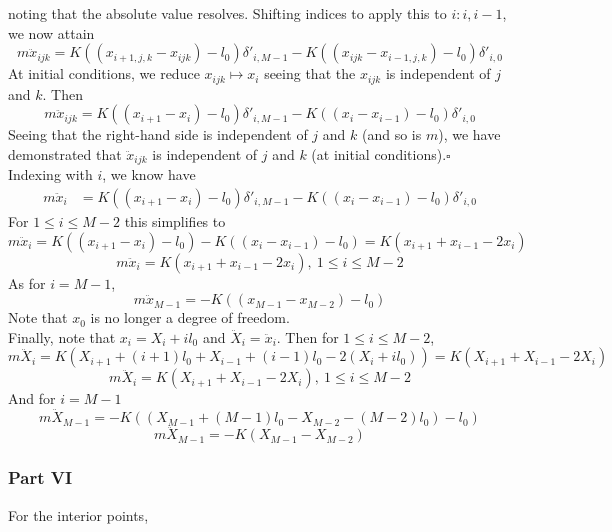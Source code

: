 \documentclass[letterpaper,12pt]{article}
\renewcommand*{\qed}{\hfill\ensuremath{\square}}
\begin{document}
\begin{flushleft}
    noting that the absolute value resolves. Shifting indices to apply this to $i:i,i-1$, we now attain
    $$m\ddot{x}_{ijk} = K\left((x_{i+1,j,k} - x_{ijk}) - l_0\right)\delta'_{i,M-1} - K\left((x_{ijk} - x_{i-1,j,k}) - l_0\right)\delta'_{i,0}$$
    At initial conditions, we reduce $x_{ijk} \mapsto x_i$ seeing that the $x_{ijk}$ is independent of $j$ and $k$. Then
    $$m\ddot{x}_{ijk} = K\left((x_{i+1} - x_{i}) - l_0\right)\delta'_{i,M-1} - K\left((x_{i} - x_{i-1}) - l_0\right)\delta'_{i,0}$$
    Seeing that the right-hand side is independent of $j$ and $k$ (and so is $m$), we have demonstrated that $\ddot{x}_{ijk}$ is independent of $j$ and $k$ (at initial conditions).\qed\\
    Indexing with $i$, we know have
    \begin{align*}
        m\ddot{x}_{i} &= K\left((x_{i+1} - x_{i}) - l_0\right)\delta'_{i,M-1} - K\left((x_{i} - x_{i-1}) - l_0\right)\delta'_{i,0}
    \end{align*}
    For $1 \leq i \leq M-2$ this simplifies to
    $$m\ddot{x}_i = K\left((x_{i+1} - x_{i}) - l_0\right) - K\left((x_{i} - x_{i-1}) - l_0\right) = K\left(x_{i+1} + x_{i-1} - 2x_i\right)$$
    $$\boxed{m\ddot{x}_i = K\left(x_{i+1} + x_{i-1} - 2x_i\right), \: 1 \leq i \leq M-2}$$
    As for $i = M-1$,
    $$\boxed{m\ddot{x}_{M-1} = -K\left((x_{M-1} - x_{M-2}) - l_0\right)}$$
    Note that $x_0$ is no longer a degree of freedom.\\
    Finally, note that $x_i = X_i + il_0$ and $\ddot{X}_i = \ddot{x}_i$. Then for $1 \leq i \leq M-2$,
    $$m\ddot{X}_i = K\left(X_{i+1} + (i+1)l_0 + X_{i-1} + (i-1)l_0 - 2\left(X_i + il_0\right)\right) = K\left(X_{i+1} + X_{i-1} - 2X_i\right)$$
    $$\boxed{m\ddot{X}_i = K\left(X_{i+1} + X_{i-1} - 2X_i\right), \: 1 \leq i \leq M-2}$$
    And for $i = M-1$
    $$m\ddot{X}_{M-1} = -K\left((X_{M-1} + (M-1)l_0 - X_{M-2} - (M-2)l_0) - l_0\right)$$
    $$\boxed{m\ddot{X}_{M-1} = -K\left(X_{M-1} - X_{M-2}\right)}$$

    \subsubsection*{Part VI}
    For the interior points,


\end{flushleft}
\end{document}
